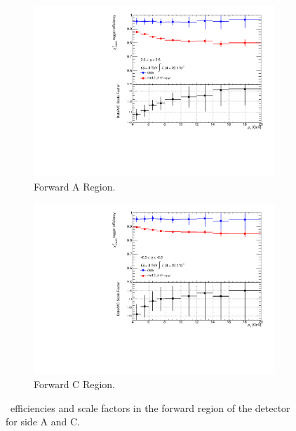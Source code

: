 \begin{figure}[htbp]
  \centering
  \begin{subfigure}[b]{0.85\textwidth}
    \includegraphics[width=\textwidth]{PartCalibration2012/Plots/SFPlots/Forward_A_smt.pdf}
    \caption{Forward A Region.}\label{fig:CalibrationScaleFactorForwardA}
  \end{subfigure}
  
  \begin{subfigure}[b]{0.85\textwidth}
    \includegraphics[width=\textwidth]{PartCalibration2012/Plots/SFPlots/Forward_C_smt.pdf}
    \caption{Forward C Region.}\label{fig:CalibrationScaleFactorForwardC}
  \end{subfigure}
  \caption[\xsm\ efficiencies and scale factors in the forward region of the detector for side A and C.]{\xsm\ efficiencies and scale factors in the forward region of the detector for side  A and  C.}\label{fig:CalibrationScaleFactorForward}
\end{figure}

